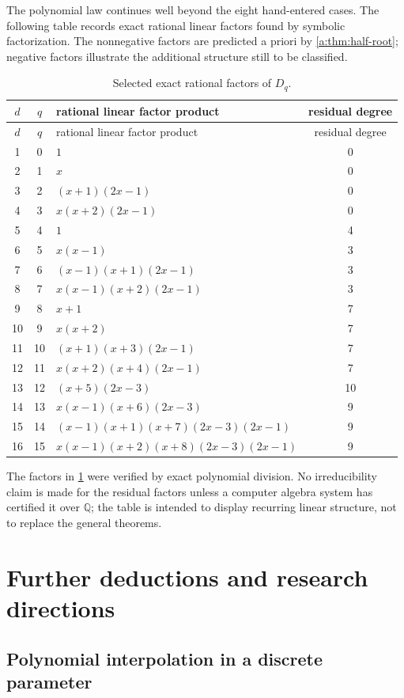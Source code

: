 \documentclass[11pt,a4paper,oneside,openany]{book}
\numberwithin{equation}{chapter}
\theoremstyle{definition}
\theoremstyle{remark}
\newcommand{\Q}{\mathbb Q}
\newcommand{\Diag}{D}
\begin{document}
The polynomial law continues well beyond the eight hand-entered cases.  The
following table records exact rational linear factors found by symbolic
factorization.  The nonnegative factors are predicted a priori by
\cref{a:thm:half-root}; negative factors illustrate the additional
structure still to be classified.

\begin{longtable}{c c p{} c}
\caption{Selected exact rational factors of \(\Diag_q\).\label{c:tab:factorizations}}\\
\toprule
\(d\)&\(q\)&rational linear factor product&residual degree\\
\midrule
\endfirsthead
\toprule
\(d\)&\(q\)&rational linear factor product&residual degree\\
\midrule
\endhead
1&0&\(1\)&0\\
2&1&\(x\)&0\\
3&2&\((x+1)(2x-1)\)&0\\
4&3&\(x(x+2)(2x-1)\)&0\\
5&4&\(1\)&4\\
6&5&\(x(x-1)\)&3\\
7&6&\((x-1)(x+1)(2x-1)\)&3\\
8&7&\(x(x-1)(x+2)(2x-1)\)&3\\
9&8&\(x+1\)&7\\
10&9&\(x(x+2)\)&7\\
11&10&\((x+1)(x+3)(2x-1)\)&7\\
12&11&\(x(x+2)(x+4)(2x-1)\)&7\\
13&12&\((x+5)(2x-3)\)&10\\
14&13&\(x(x-1)(x+6)(2x-3)\)&9\\
15&14&\((x-1)(x+1)(x+7)(2x-3)(2x-1)\)&9\\
16&15&\(x(x-1)(x+2)(x+8)(2x-3)(2x-1)\)&9\\
\bottomrule
\end{longtable}

The factors in \cref{c:tab:factorizations} were verified by exact polynomial
division.  No irreducibility claim is made for the residual factors unless a
computer algebra system has certified it over \(\Q\); the table is intended
to display recurring linear structure, not to replace the general theorems.
\chapter{Further deductions and research directions}\label{ch:future}

\section{Polynomial interpolation in a discrete parameter}
\end{document}
